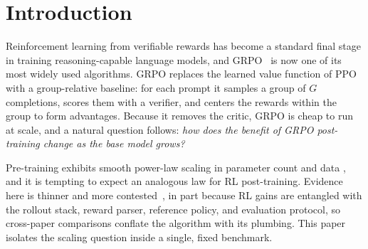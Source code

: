 \section{Introduction}
\label{sec:p1-intro}
Reinforcement learning from verifiable rewards has become a standard final stage
in training reasoning-capable language models, and GRPO~\citep{shao2024deepseekmath, guo2025deepseekr1} is now one of its most widely used algorithms. GRPO replaces
the learned value function of PPO~\citep{schulman2017proximal} with a
group-relative baseline: for each prompt it samples a group of $G$ completions,
scores them with a verifier, and centers the rewards within the group to form
advantages. Because it removes the critic, GRPO is cheap to run at scale, and a
natural question follows: \emph{how does the benefit of GRPO post-training change
as the base model grows?}

Pre-training exhibits smooth power-law scaling in parameter count and data
\citep{kaplan2020scalinglaws, hoffmann2022chinchilla}, and it is tempting to expect
an analogous law for RL post-training. Evidence here is thinner and more
contested~\citep{hilton2023rlscaling, rafailov2024rlhfscaling, nimmaturi2025predictive},
in part because RL gains are entangled with the rollout stack, reward parser,
reference policy, and evaluation protocol, so cross-paper comparisons conflate the
algorithm with its plumbing. This paper isolates the scaling question inside a
single, fixed benchmark.

